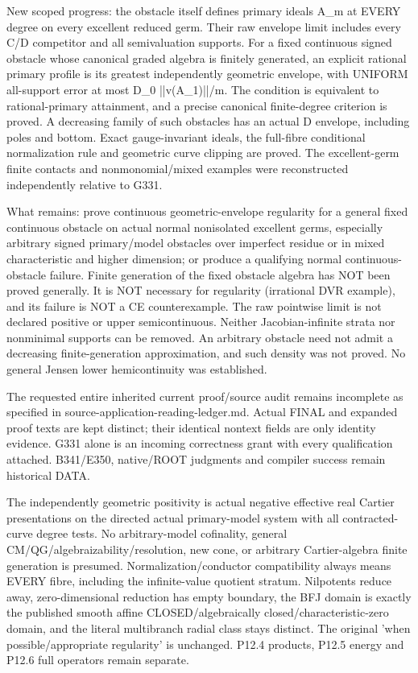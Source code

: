 \documentclass[11pt]{article}
\begin{document}
New scoped progress: the obstacle itself defines primary ideals A\_m at EVERY degree on every excellent reduced germ. Their raw envelope limit includes every C/D competitor and all semivaluation supports. For a fixed continuous signed obstacle whose canonical graded algebra is finitely generated, an explicit rational primary profile is its greatest independently geometric envelope, with UNIFORM all-support error at most D\_0 ||v(A\_1)||/m. The condition is equivalent to rational-primary attainment, and a precise canonical finite-degree criterion is proved. A decreasing family of such obstacles has an actual D envelope, including poles and bottom. Exact gauge-invariant ideals, the full-fibre conditional normalization rule and geometric curve clipping are proved. The excellent-germ finite contacts and nonmonomial/mixed examples were reconstructed independently relative to G331.

What remains: prove continuous geometric-envelope regularity for a general fixed continuous obstacle on actual normal nonisolated excellent germs, especially arbitrary signed primary/model obstacles over imperfect residue or in mixed characteristic and higher dimension; or produce a qualifying normal continuous-obstacle failure. Finite generation of the fixed obstacle algebra has NOT been proved generally. It is NOT necessary for regularity (irrational DVR example), and its failure is NOT a CE counterexample. The raw pointwise limit is not declared positive or upper semicontinuous. Neither Jacobian-infinite strata nor nonminimal supports can be removed. An arbitrary obstacle need not admit a decreasing finite-generation approximation, and such density was not proved. No general Jensen lower hemicontinuity was established.

The requested entire inherited current proof/source audit remains incomplete as specified in source-application-reading-ledger.md. Actual FINAL and expanded proof texts are kept distinct; their identical nontext fields are only identity evidence. G331 alone is an incoming correctness grant with every qualification attached. B341/E350, native/ROOT judgments and compiler success remain historical DATA.

The independently geometric positivity is actual negative effective real Cartier presentations on the directed actual primary-model system with all contracted-curve degree tests. No arbitrary-model cofinality, general CM/QG/algebraizability/resolution, new cone, or arbitrary Cartier-algebra finite generation is presumed. Normalization/conductor compatibility always means EVERY fibre, including the infinite-value quotient stratum. Nilpotents reduce away, zero-dimensional reduction has empty boundary, the BFJ domain is exactly the published smooth affine CLOSED/algebraically closed/characteristic-zero domain, and the literal multibranch radial class stays distinct. The original 'when possible/appropriate regularity' is unchanged. P12.4 products, P12.5 energy and P12.6 full operators remain separate.
\end{document}
